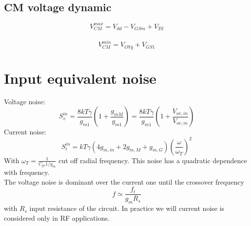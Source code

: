 \subsection{CM voltage dynamic}
\begin{equation}
V_{CM}^{max}=V_{dd}-V_{GSm}+V_{Td}
\end{equation}
\\
\begin{equation}
V_{CM}^{min}=V_{OVg}+V_{GS1}
\end{equation}

\section{Input equivalent noise}
Voltage noise: 
\begin{equation}
S_v^{in}=\frac{8kT\gamma}{g_{m1}}(1+\frac{g_{mM}}{g_{m1}})=\frac{8kT\gamma}{g_{m1}}(1+\frac{V_{ov,in}}{V_{ov,m}})
\end{equation}
Current noise:
\begin{equation}
S_i^{in}=kT\gamma(4g_{m,in}+2g_{m,M}+g_{m,G})(\frac{\omega}{\omega_T})^2
\end{equation}
With $\omega_T=\frac{1}{C_{gs}1/g_m}$ cut off radial frequency. This noise has a quadratic dependence with frequency.\\
The voltage noise is dominant over the current one until the crossover frequency
\begin{equation}
f\simeq \frac{f_t}{g_mR_s}
\end{equation}
with $R_s$ input resistance of the circuit. In practice we will current noise is considered only in RF applications.


